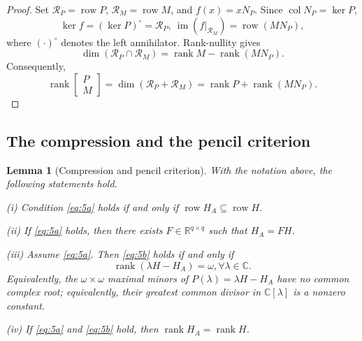 \documentclass[journal]{IEEEtran}
\theoremstyle{plainn}
\newtheorem{lem}{Lemma}
\theoremstyle{remark}
\begin{document}
\begin{proof}
	Set $\mathcal R_P=\operatorname{row}P$, $\mathcal R_M=\operatorname{row}M$, and
	$f(x)=xN_P$. Since $\operatorname{col}N_P=\ker P$,
	\begin{equation*}
	\ker f=(\ker P)^\circ=\mathcal R_P,\ 
	\operatorname{im}(f|_{\mathcal R_M})=\operatorname{row}(MN_P),
	\end{equation*}
	where $(\cdot)^\circ$ denotes the left annihilator. Rank-nullity gives
	\begin{equation*}
	\dim(\mathcal R_P\cap\mathcal R_M)
	=\operatorname{rank}M-\operatorname{rank}(MN_P).
	\end{equation*}
	Consequently,
	\begin{equation*}
	\operatorname{rank}\begin{bmatrix}P\\M\end{bmatrix}
	=\dim(\mathcal R_P+\mathcal R_M)
	=\operatorname{rank}P+\operatorname{rank}(MN_P).
	\end{equation*}
\end{proof}



\subsection{The compression and the pencil criterion}\label{sec:compression}

\begin{lem}[Compression and pencil criterion]\label{lem:compression}
	With the notation above, the following statements hold.
	
	(i) Condition \eqref{eq:5a} holds if and only if
	$\operatorname{row}H_A\subseteq\operatorname{row}H$.
	
	(ii) If \eqref{eq:5a} holds, then there exists
	$F\in\mathbb R^{q\times q}$ such that $H_A=FH$.
	
	(iii) Assume \eqref{eq:5a}. Then \eqref{eq:5b} holds if and only if
	\begin{equation*}
	\operatorname{rank}(\lambda H-H_A)=\omega
	,\forall \lambda\in\mathbb C.
	\end{equation*}
	Equivalently, the $\omega\times\omega$ maximal minors of $P(\lambda)=\lambda H-H_A$
	have no common complex root; equivalently, their greatest common divisor in $\mathbb C[\lambda]$ is a nonzero constant.
	
	(iv) If \eqref{eq:5a} and \eqref{eq:5b} hold, then
	$\operatorname{rank}H_A=\operatorname{rank}H$.
\end{lem}
\end{document}
